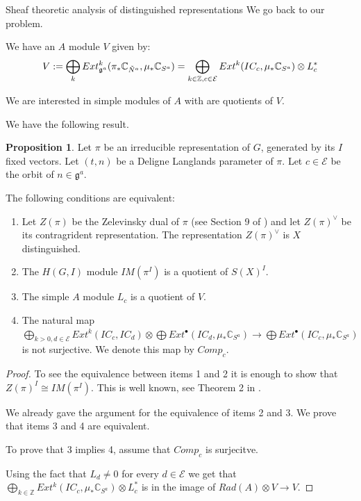 \documentclass[12pt]{article}
\newcommand{\C}{\mathbb{C}}
\newcommand{\Z}{\mathbb{Z}}
\newcommand{\<}{\langle}
\renewcommand{\>}{\rangle}
\theoremstyle{plain}
\theoremstyle{definition}
\newtheorem{prop}[theorem]{Proposition}
\begin{document}
\begin{section}{Sheaf theoretic analysis of distinguished representations}
We go back to our problem.

We have an $A$ module $V$ given by: $$V:=\bigoplus_k Ext^k_{\mathfrak{g}^a}(\pi_*\C_{\Tilde{N}^a},\mu_*\C_{S^a})=\bigoplus_{k\in \Z,c\in\mathcal{E}}Ext^k(IC_c,\mu_*\C_{S^a})\otimes L_c^*$$


We are interested in simple modules of $A$ with are quotients of $V$. 

We have the following result.
\begin{prop}\label{sheaf condition}
    Let $\pi$ be an irreducible representation of $G$, generated by its $I$ fixed vectors. Let $(t,n)$ be a Deligne Langlands parameter of $\pi$. Let $c\in\mathcal{E}$ be the orbit of $n\in \mathfrak{g}^a$.

    The following conditions are equivalent:

    \begin{enumerate}
        \item Let $Z(\pi)$ be the Zelevinsky dual of $\pi$ (see Section 9 of \cite{Zelevinsky1980}) and let $Z(\pi)^\vee$ be its contragrident representation. The representation $Z(\pi)^\vee$ is $X$ distinguished. 
        \item The $H(G,I)$ module  $IM(\pi^I)$ is a quotient of $S(X)^I$.
        \item The simple $A$ module $L_c$ is a quotient of $V$.
        \item The natural map $\bigoplus_{k>0,d\in\mathcal{E}}Ext^k(IC_c,IC_d)\otimes \bigoplus Ext^{\bullet}(IC_d,\mu_*\C_{S^a})\rightarrow\bigoplus Ext^\bullet(IC_c,\mu_*\C_{S^a})$ is not surjective. We denote this map by $Comp_c$.
    \end{enumerate}
    
\end{prop}

\begin{proof}
    To see the equivalence between items 1 and 2 it is enough to show that $Z(\pi)^I\cong IM(\pi^I)$. This is well known, see Theorem 2 in \cite{Duality_for_representations_of_a_Hecke_algebra}.    

    We already gave the argument for the equivalence of items 2 and 3. We prove that items 3 and 4 are equivalent.

    To prove that 3 implies 4, assume that $Comp_c$  is surjecitve.  
    
    
    Using the fact that $L_d\neq 0$ for every $d\in \mathcal{E}$ we get that $\bigoplus_{k\in \Z}Ext^k(IC_c,\mu_*\C_{S^a})\otimes L_c^*$ is in the image of $Rad(A)\otimes V\rightarrow V$. 


\end{proof}
\end{section}
\end{document}
